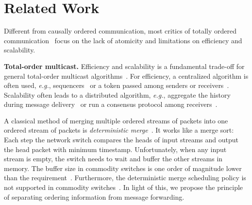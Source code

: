 \section{Related Work}
\label{sec:related}


Different from causally ordered communication, most critics of totally ordered communication~\cite{cheriton1994understanding} focus on the lack of atomicity and limitations on efficiency and scalability.

\textbf{Total-order multicast.}
Efficiency and scalability is a fundamental trade-off for general total-order multicast algorithms~\cite{defago2004total}.
For efficiency, a centralized algorithm is often used, \textit{e.g.}, sequencers~\cite{eris} or a token passed among senders or receivers~\cite{rajagopalan1989token,kim1997total,ekwall2004token}.
Scalability often leads to a distributed algorithm, \textit{e.g.}, aggregate the history during message delivery~\cite{chandra1996unreliable} or run a consensus protocol among receivers~\cite{lamport1978time}.

A classical method of merging multiple ordered streams of packets into one ordered stream of packets is \textit{deterministic merge}~\cite{hadzilacos1994modular, aguilera2000efficient}.
It works like a merge sort: Each step the network switch compares the heads of input streams and output the head packet with minimum timestamp. %
Unfortunately, when any input stream is empty, the switch needs to wait and buffer the other streams in memory.
The buffer size in commodity switches is one order of magnitude lower than the requirement~\cite{bai2017congestion}.
Furthermore, the deterministic merge scheduling policy is not supported in commodity switches~\cite{sivaraman2015towards,sivaraman2016programmable}. In light of this, we propose the principle of separating ordering information from message forwarding.

